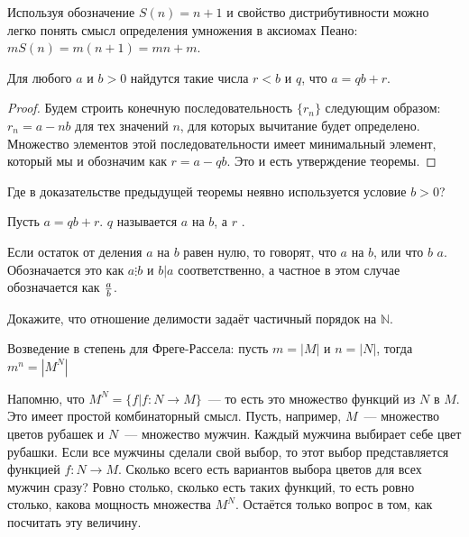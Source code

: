 Используя обозначение $S(n) = n+1$ и свойство дистрибутивности можно легко понять смысл определения умножения в аксиомах Пеано: $mS(n) = m(n+1) = mn + m$.

\begin{thm}
Для любого $a$ и $b > 0$ найдутся такие числа $r<b$ и $q$, что $a = qb + r$.
\end{thm}
\begin{proof}
Будем строить конечную последовательность $\{r_n\}$ следующим образом: $r_n = a - nb$ для тех значений $n$, для которых вычитание будет определено. Множество элементов этой последовательности имеет минимальный элемент, который мы и обозначим как $r = a - qb$. Это и есть утверждение теоремы.
\end{proof}

\begin{exercise}
Где в доказательстве предыдущей теоремы неявно используется условие $b>0$?
\end{exercise}

\begin{definition}
Пусть $a = qb + r$. $q$ называется  $a$ на $b$, а $r$ .
\end{definition}

\begin{definition}
Если остаток от деления $a$ на $b$ равен нулю, то говорят, что $a$  на $b$, или что $b$  $a$. Обозначается это как $a\vdots b$ и  $b|a$ соответственно, а частное в этом случае обозначается как $a\over b$.
\end{definition}

\begin{exercise}
Докажите, что отношение делимости задаёт частичный порядок на $\mathbb{N}$.
\end{exercise}

\begin{definition}
Возведение в степень для Фреге-Рассела: пусть $m = |M|$ и $n = |N|$, тогда $m^n = |M^N|$
\end{definition}

Напомню, что $M^N = \{f|f:N\to M\}$~— то есть это множество функций из $N$ в $M$. Это имеет простой комбинаторный смысл. Пусть, например, $M$~— множество цветов рубашек и $N$~— множество мужчин. Каждый мужчина выбирает себе цвет рубашки. Если все мужчины сделали свой выбор, то этот выбор представляется функцией $f: N \to M$. Сколько всего есть вариантов выбора цветов для всех мужчин сразу? Ровно столько, сколько есть таких функций, то есть ровно столько, какова мощность множества $M^N$. Остаётся только вопрос в том, как посчитать эту величину.

